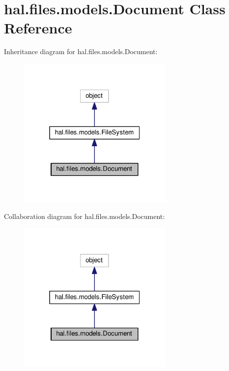 \hypertarget{classhal_1_1files_1_1models_1_1_document}{}\section{hal.\+files.\+models.\+Document Class Reference}
\label{classhal_1_1files_1_1models_1_1_document}


Inheritance diagram for hal.\+files.\+models.\+Document\+:\nopagebreak
\begin{figure}[H]
\begin{center}
\leavevmode
\includegraphics[width=217pt]{classhal_1_1files_1_1models_1_1_document__inherit__graph}
\end{center}
\end{figure}


Collaboration diagram for hal.\+files.\+models.\+Document\+:\nopagebreak
\begin{figure}[H]
\begin{center}
\leavevmode
\includegraphics[width=217pt]{classhal_1_1files_1_1models_1_1_document__coll__graph}
\end{center}
\end{figure}
